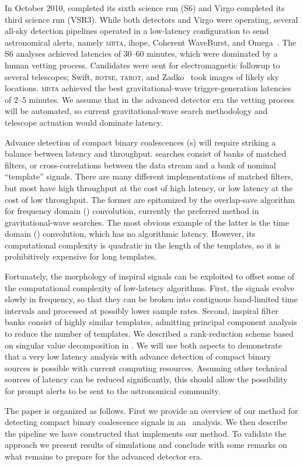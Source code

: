In October 2010, \LIGO{} completed its sixth science run
(S6) and Virgo completed its third science run (VSR3).  While both
\LIGO{} detectors and Virgo were operating, several all-sky detection
pipelines operated in a low-latency configuration to send astronomical alerts,
namely \textsc{mbta}, ihope,
Coherent WaveBurst, and Omega~\cite{HugheyGWPAW2011, S6lowlatency}.
 The S6 analyses
achieved latencies of 30--60 minutes, which were dominated by a human vetting
process. Candidates were sent for electromagnetic followup to several
telescopes; Swift, \textsc{rotse}, \textsc{tarot}, and Zadko~\cite{kanner2008,
HugheyGWPAW2011} took images of likely sky locations.  \textsc{mbta} achieved
the best gravitational-wave trigger-generation latencies of 2--5 minutes.  We
assume that in the advanced detector era the vetting process will be automated,
so current gravitational-wave search methodology and telescope actuation would
dominate latency.

Advance detection of compact binary coalescences (\CBC{}s) will require striking a balance between latency
and throughput.  \CBC{} searches consist of banks of matched filters, or
cross-correlations between the data stream and a bank of nominal ``template''
signals.  There are many different implementations of matched filters, but most
have high throughput at the cost of high latency, or low latency at the cost of
low throughput.  The former are epitomized by the overlap-save algorithm
\cite{numerical-recipes-chapter-13} for frequency domain (\FD) convolution,
currently the preferred method in gravitational-wave
searches.  The most obvious example of the latter is the time domain
(\TD) convolution, which has no algorithmic latency.  However, its
computational complexity is quadratic in the length of the templates, so it is
prohibitively expensive for long templates.

Fortunately, the morphology of inspiral signals can be exploited to offset some
of the computational complexity of low-latency algorithms.  First, the signals
evolve slowly in frequency, so that they can be broken into contiguous
band-limited time intervals and processed at possibly lower sample rates.
Second, inspiral filter banks consist of highly similar templates, admitting
principal component analysis to reduce the number of templates.  We described a
rank-reduction scheme based on singular value decomposition in
\cite{Cannon:2010p10398}.  We will use both aspects to demonstrate that a very
low latency analysis with advance detection of compact binary sources is
possible with current computing resources.  Assuming other technical sources of
latency can be reduced significantly, this should allow the possibility for
prompt alerts to be sent to the astronomical community.

The paper is organized as follows. First we provide an overview of our method
for detecting compact binary coalescence signals in an \earlywarning\ analysis.
We then describe the pipeline we have constructed that implements our method.
To validate the approach we present results of simulations and conclude with
some remarks on what remains to prepare for the advanced detector era.

